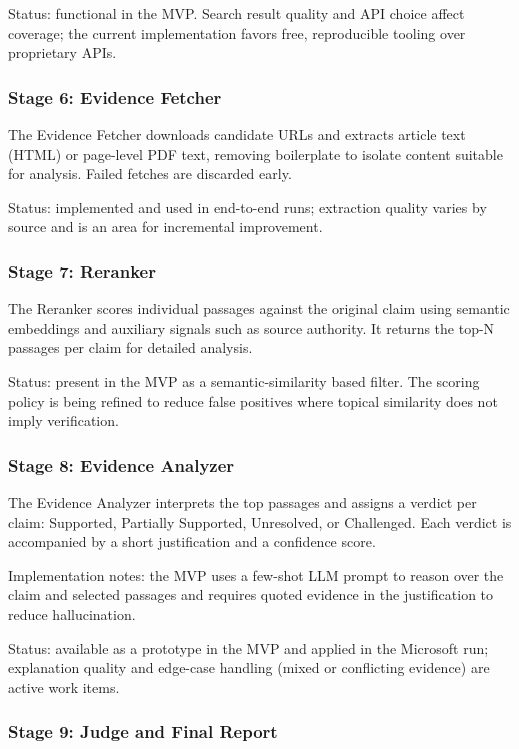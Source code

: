 Status: functional in the MVP. Search result quality and API choice affect coverage; the current implementation favors free, reproducible tooling over proprietary APIs.

\subsubsection{Stage 6: Evidence Fetcher}

The Evidence Fetcher downloads candidate URLs and extracts article text (HTML) or page-level PDF text, removing boilerplate to isolate content suitable for analysis. Failed fetches are discarded early.

Status: implemented and used in end-to-end runs; extraction quality varies by source and is an area for incremental improvement.

\subsubsection{Stage 7: Reranker}

The Reranker scores individual passages against the original claim using semantic embeddings and auxiliary signals such as source authority. It returns the top-N passages per claim for detailed analysis.

Status: present in the MVP as a semantic-similarity based filter. The scoring policy is being refined to reduce false positives where topical similarity does not imply verification.

\subsubsection{Stage 8: Evidence Analyzer}

The Evidence Analyzer interprets the top passages and assigns a verdict per claim: Supported, Partially Supported, Unresolved, or Challenged. Each verdict is accompanied by a short justification and a confidence score.

Implementation notes: the MVP uses a few-shot LLM prompt to reason over the claim and selected passages and requires quoted evidence in the justification to reduce hallucination.

Status: available as a prototype in the MVP and applied in the Microsoft run; explanation quality and edge-case handling (mixed or conflicting evidence) are active work items.

\subsubsection{Stage 9: Judge and Final Report}

